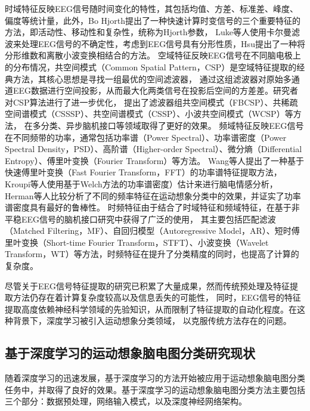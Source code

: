 时域特征反映EEG信号随时间变化的特性，其包括均值、方差、标准差、峰度、偏度等统计量，此外，Bo Hjorth提出了一种快速计算时变信号的三个重要特征的方法，即活动性、移动性和复杂性，统称为Hjorth参数\cite{HJORTH1970306}，
Luke等人使用卡尔曼滤波来处理EEG信号的不确定性\cite{7448410}，考虑到EEG信号具有分形性质，Hsu提出了一种将分形维数和离散小波变换相结合的方法\cite{HSU2010295}。
空域特征反映EEG信号在不同脑电极上的分布情况，共空间模式（Common Spatial Pattern，CSP）是空域特征提取的经典方法，其核心思想是寻找一组最优的空间滤波器，
通过这组滤波器对原始多通道EEG数据进行空间投影，从而最大化两类信号在投影后空间的方差差\cite{wang2006common}。研究者对CSP算法进行了进一步优化，
提出了滤波器组共空间模式（FBCSP）\cite{ang2008filter}、共稀疏空间谱模式（CSSSP）\cite{dornhege2006combined}、共空间谱模式（CSSP）\cite{lemm2005spatio}、小波共空间模式（WCSP）\cite{mousavi2011wavelet}等方法，
在多分类、异步脑机接口等领域取得了更好的效果。
频域特征反映EEG信号在不同频带的功率，通常包括功率谱（Power Spectral）、功率谱密度（Power Spectral Density，PSD）、高阶谱（Higher-order Spectral）、微分熵（Differential Entropy）、傅里叶变换（Fourier Transform）等方法。
Wang等人提出了一种基于快速傅里叶变换（Fast Fourier Transform，FFT）的功率谱特征提取方法\cite{wang2017tinnitus}，Kroupi等人使用基于Welch方法的功率谱密度）估计来进行脑电情感分析\cite{kroupi2011eeg}，
Herman等人比较分析了不同的频率特征在运动想象分类中的效果，并证实了功率谱密度具有最好的鲁棒性\cite{herman2008comparative}。
时频特征由于结合了时域特征和频域特征，在基于非平稳EEG信号的脑机接口研究中获得了广泛的使用\cite{pawar2020feature}，
其主要包括匹配滤波（Matched Filtering，MF）、自回归模型（Autoregressive Model，AR）、短时傅里叶变换（Short-time Fourier Transform，STFT）、小波变换（Wavelet Transform，WT）等方法，时频特征在提升了分类精度的同时，也提高了计算的复杂度。

尽管关于EEG信号特征提取的研究已积累了大量成果，然而传统预处理及特征提取方法仍存在着计算复杂度较高以及信息丢失的可能性，
同时，EEG信号的特征提取高度依赖神经科学领域的先验知识，从而限制了特征提取的自动化程度\cite{altaheri2023deep}。在这种背景下，深度学习被引入运动想象分类领域，
以克服传统方法存在的问题。

\subsection{基于深度学习的运动想象脑电图分类研究现状}

随着深度学习的迅速发展，基于深度学习的方法开始被应用于运动想象脑电图分类任务中，并取得了良好的效果。基于深度学习的运动想象脑电图分类方法主要包括三个部分：数据预处理，网络输入模式，以及深度神经网络架构。

